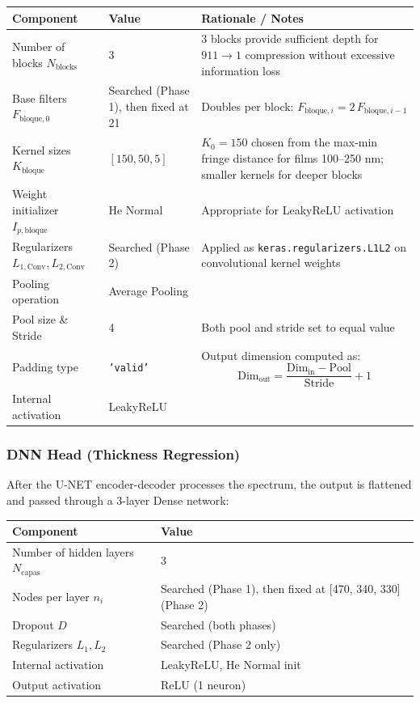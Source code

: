 \documentclass[11pt,a4paper]{article}
\begin{document}
\begin{longtable}{llp{6cm}}
\toprule
\textbf{Component} & \textbf{Value} & \textbf{Rationale / Notes} \\
\midrule
Number of blocks $N_{\text{blocks}}$ & 3 & 3 blocks provide sufficient depth for $911 \to 1$ compression without excessive information loss \\
Base filters $F_{\text{bloque},0}$ & Searched (Phase 1), then fixed at 21 & Doubles per block: $F_{\text{bloque},i} = 2\,F_{\text{bloque},i-1}$ \\
Kernel sizes $K_{\text{bloque}}$ & $[150, 50, 5]$ & $K_0 = 150$ chosen from the max-min fringe distance for films 100--250 nm; smaller kernels for deeper blocks \\
Weight initializer $I_{p,\text{bloque}}$ & He Normal & Appropriate for LeakyReLU activation \\
Regularizers $L_{1,\text{Conv}}, L_{2,\text{Conv}}$ & Searched (Phase 2) & Applied as \texttt{keras.regularizers.L1L2} on convolutional kernel weights \\
Pooling operation & Average Pooling &  \\
Pool size \& Stride & 4 & Both pool and stride set to equal value \\
Padding type & \texttt{'valid'} & Output dimension computed as:
\begin{equation*}
\text{Dim}_{\text{out}} = \frac{\text{Dim}_{\text{in}} - \text{Pool}}{\text{Stride}} + 1
\end{equation*} \\
Internal activation & LeakyReLU &  \\
\bottomrule
\end{longtable}

\subsubsection*{DNN Head (Thickness Regression)}

After the U-NET encoder-decoder processes the spectrum, the output is flattened and passed through a 3-layer Dense network:

\begin{longtable}{lp{9cm}}
\toprule
\textbf{Component} & \textbf{Value} \\
\midrule
Number of hidden layers $N_{\text{capas}}$ & 3 \\
Nodes per layer $n_i$ & Searched (Phase 1), then fixed at [470, 340, 330] (Phase 2) \\
Dropout $D$ & Searched (both phases) \\
Regularizers $L_1, L_2$ & Searched (Phase 2 only) \\
Internal activation & LeakyReLU, He Normal init \\
Output activation & ReLU (1 neuron) \\
\bottomrule
\end{longtable}
\end{document}
